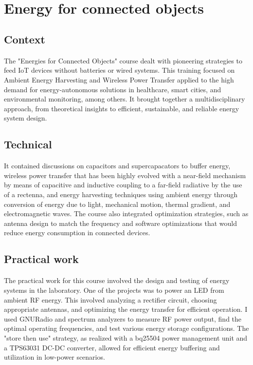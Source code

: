 \section{Energy for connected objects}
\subsection{Context}
\paragraph{}The "Energies for Connected Objects" course dealt with pioneering strategies to feed IoT devices without batteries or wired systems. This training focused on Ambient Energy Harvesting and Wireless Power Transfer applied to the high demand for energy-autonomous solutions in healthcare, smart cities, and environmental monitoring, among others. It brought together a multidisciplinary approach, from theoretical insights to efficient, sustainable, and reliable energy system design.

\subsection{Technical}
\paragraph{}It contained discussions on capacitors and supercapacators to buffer energy, wireless power transfer that has been highly evolved with a near-field mechanism by means of capacitive and inductive coupling to a far-field radiative by the use of a rectenna, and energy harvesting techniques using ambient energy through conversion of energy due to light, mechanical motion, thermal gradient, and electromagnetic waves. The course also integrated optimization strategies, such as antenna design to match the frequency and software optimizations that would reduce energy consumption in connected devices.

\subsection{Practical work}
\paragraph{}The practical work for this course involved the design and testing of energy systems in the laboratory. One of the projects was to power an LED from ambient RF energy. This involved analyzing a rectifier circuit, choosing appropriate antennas, and optimizing the energy transfer for efficient operation. I used GNURadio and spectrum analyzers to measure RF power output, find the optimal operating frequencies, and test various energy storage configurations. The "store then use" strategy, as realized with a bq25504 power management unit and a TPS63031 DC-DC converter, allowed for efficient energy buffering and utilization in low-power scenarios.

